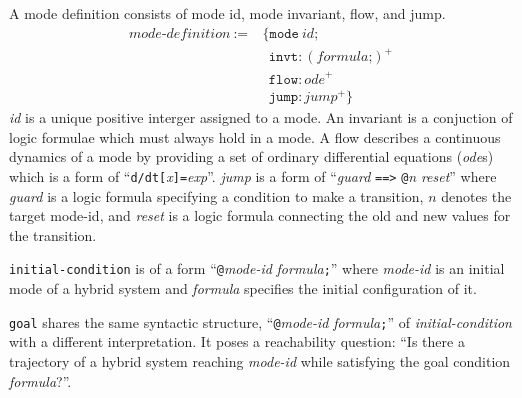 A mode definition consists of mode id, mode invariant, flow, and jump.
\begin{align*}
  \textit{mode-definition} \ := & \ \texttt{\{}
                                    \texttt{mode} \ \textit{id}\texttt{;}\\
                           & \ \ \  \texttt{invt}:(\textit{formula} \texttt{;})^+\\
                           & \ \ \  \texttt{flow}:\textit{ode}^+\\
                           & \ \ \ \texttt{jump}:\textit{jump}^+ \texttt{\}}
\end{align*}
\textit{id} is a unique positive interger assigned to a mode. An
invariant is a conjuction of logic formulae which must always hold in
a mode. A flow describes a continuous dynamics of a mode by providing
a set of ordinary differential equations (\textit{ode}s) which is a
form of
``\texttt{d/dt[}\textit{x}\texttt{]=}\textit{exp}''. \textit{jump} is
a form of ``\textit{guard} \texttt{==>} \texttt{@}\textit{n}
\textit{reset}'' where \textit{guard} is a logic formula specifying a
condition to make a transition, $n$ denotes the target mode-id, and
\textit{reset} is a logic formula connecting the old and new values
for the transition.

\texttt{initial-condition} is of a form
``\texttt{@}\textit{mode-id} \textit{formula}\texttt{;}''
where \textit{mode-id} is an initial mode of a hybrid system and
\textit{formula} specifies the initial configuration of it.

\texttt{goal} shares the same syntactic structure,
``\texttt{@}\textit{mode-id} \textit{formula}\texttt{;}'' of
\textit{initial-condition} with a different interpretation. It poses a
reachability question: ``Is there a trajectory of a hybrid system
reaching \textit{mode-id} while satisfying the goal condition \textit{formula}?''.

